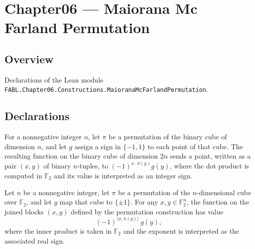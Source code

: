 \chapter{Chapter06 — Maiorana Mc Farland Permutation}
\section{Overview}

Declarations of the Lean module \texttt{FABL.Chapter06.Constructions.MaioranaMcFarlandPermutation}.

\section{Declarations}

\begin{definition}
\label{FABL.maioranaMcFarlandPermutation}
\leanok
{}
For a nonnegative integer $n$, let $\pi$ be a permutation of the binary cube of
dimension $n$, and let $g$ assign a sign in $\{-1,1\}$ to each point of that cube. The
resulting function on the binary cube of dimension $2n$ sends a point, written as a pair
$(x,y)$ of binary $n$-tuples, to $(-1)^{x\cdot\pi(y)}g(y)$, where the dot product is
computed in $\mathbb F_2$ and its value is interpreted as an integer sign.
\end{definition}

\begin{theorem}
\leanok
{}
Let $n$ be a nonnegative integer, let $\pi$ be a permutation of the $n$-dimensional cube
over $\mathbb F_2$, and let $g$ map that cube to $\{\pm1\}$. For any $x,y\in\mathbb
F_2^n$, the function on the joined blocks $(x,y)$ defined by the permutation
construction has value
\[(-1)^{\langle x,\pi(y)\rangle}\,g(y),\]
where the inner product is taken in $\mathbb F_2$ and the exponent is interpreted as the
associated real sign.
\end{theorem}

